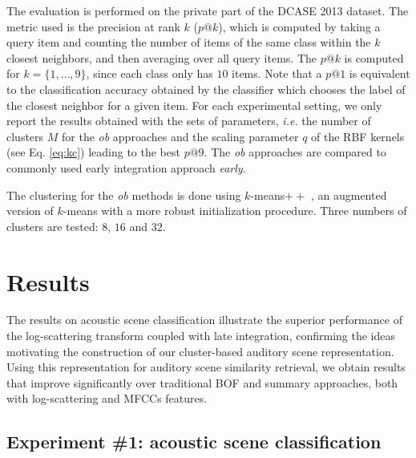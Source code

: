 \documentclass[journal]{IEEEtran}
\newcommand{\ja}[1]{\textcolor{magenta}{Joakim : #1}}
\begin{document}
The evaluation is performed on the private part of the DCASE 2013 dataset. The metric used is the precision at rank $k$ ($p@k$), which is computed by taking a query item and counting the number of items of the same class within the $k$ closest neighbors, and then averaging over all query items. The $p@k$ is computed for $k=\lbrace 1,\ldots,9\rbrace$, since each class only has $10$ items. Note that a $p@1$ is equivalent to the classification accuracy obtained by the classifier which chooses the label of the closest neighbor for a given item. For each experimental setting, we only report the results obtained with the sets of parameters, \emph{i.e.} the number of clusters $M$ for the \emph{ob} approaches and the scaling parameter $q$ of the RBF kernels (see Eq. \ref{eq:kc}) leading to the best $p@9$. The \emph{ob} approaches are compared to commonly used early integration approach \emph{early}. %

The clustering for the \emph{ob} methods is done using $k$-means$++$ \cite{arthur2007k}, an augmented version of $k$-means with a more robust initialization procedure. Three numbers of clusters are tested: $8$, $16$ and $32$. 


\section{Results \label{sec:results}}

The results on acoustic scene classification illustrate the superior performance of the log-scattering transform coupled with late integration, confirming the ideas motivating the construction of our cluster-based auditory scene representation. Using this representation for auditory scene similarity retrieval, we obtain results that improve significantly over traditional BOF and summary approaches, both with log-scattering and MFCCs features.

\subsection{Experiment \#1: acoustic scene classification}
\end{document}
